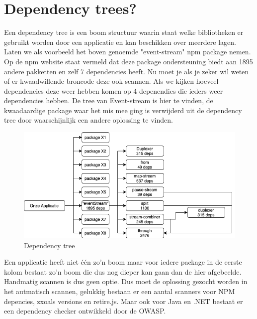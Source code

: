 \section{Dependency trees?}\label{sec:dependency-trees?}
Een dependency tree is een boom structuur waarin staat welke bibliotheken er gebruikt worden door een applicatie en kan beschikken over meerdere lagen.
Laten we als voorbeeld het boven genoemde "event-stream" npm package nemen.
Op de npm website staat vermeld dat deze package ondersteuning biedt aan 1895 andere pakketten en zelf 7 dependencies heeft.
Nu moet je als je zeker wil weten of er kwaadwillende broncode deze ook scannen. 
Als we kijken hoeveel dependencies deze weer hebben komen op 4 depenendies die ieders weer dependencies hebben.
De tree van Event-stream is hier te vinden, de kwaadaardige package waar het mis mee ging is verwijderd uit de dependency tree door waarschijnlijk een andere oplossing te vinden.

\begin{figure}[H]
    \myfloatalign
    \includegraphics[width=12cm]{gfx/dependency-tree}
    \caption{Dependency tree}\label{fig:dependency-tree}
\end{figure}
Een applicatie heeft niet één zo'n boom maar voor iedere package in de eerste kolom bestaat zo'n boom die dus nog dieper kan gaan dan de hier afgebeelde.
Handmatig scannen is dus geen optie.
Dus moet de oplossing gezocht worden in het autmatisch scannen, gelukkig bestaan er een aantal scanners voor NPM depencies, zxoals versions en retire.js.
Maar ook voor Java en .NET bestaat er een dependency checker ontwikkeld door de OWASP\@.


